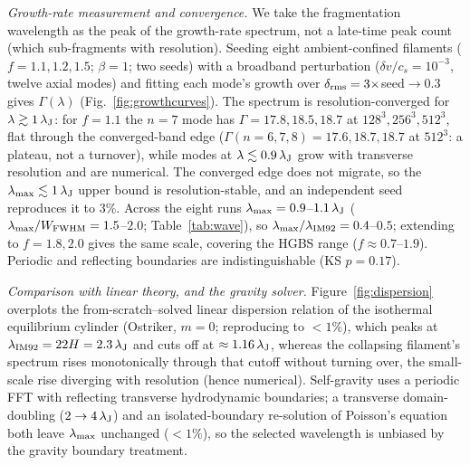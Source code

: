 \documentclass[usenatbib,twoside,twocolumn]{mnras}
\begin{document}
\emph{Growth-rate measurement and convergence.} We take the fragmentation wavelength as the peak of the growth-rate spectrum, not a late-time peak count (which sub-fragments with resolution). Seeding eight ambient-confined filaments ($f=1.1,1.2,1.5$; $\beta=1$; two seeds) with a broadband perturbation ($\delta v/c_s=10^{-3}$, twelve axial modes) and fitting each mode's growth over $\delta_{\rm rms}=3\times$seed$\to0.3$ gives $\Gamma(\lambda)$ (Fig.~\ref{fig:growthcurves}). The spectrum is resolution-converged for $\lambda\gtrsim1\,\lambda_{\rm J}$: for $f=1.1$ the $n=7$ mode has $\Gamma=17.8,18.5,18.7$ at $128^3,256^3,512^3$, flat through the converged-band edge ($\Gamma(n{=}6,7,8)=17.6,18.7,18.7$ at $512^3$: a plateau, not a turnover), while modes at $\lambda\lesssim0.9\,\lambda_{\rm J}$ grow with transverse resolution and are numerical. The converged edge does not migrate, so the $\lambda_{\rm max}\lesssim1\,\lambda_{\rm J}$ upper bound is resolution-stable, and an independent seed reproduces it to $3\%$. Across the eight runs $\lambda_{\rm max}=0.9$--$1.1\,\lambda_{\rm J}$ ($\lambda_{\rm max}/W_{\rm FWHM}=1.5$--$2.0$; Table~\ref{tab:wave}), so $\lambda_{\rm max}/\lambda_{\rm IM92}=0.4$--$0.5$; extending to $f=1.8,2.0$ gives the same scale, covering the HGBS range ($f\approx0.7$--$1.9$). Periodic and reflecting boundaries are indistinguishable (KS $p=0.17$).

\emph{Comparison with linear theory, and the gravity solver.} Figure~\ref{fig:dispersion} overplots the from-scratch--solved linear dispersion relation of the isothermal equilibrium cylinder (Ostriker, $m=0$; reproducing \citealt{Nagasawa1987,Inutsuka1992,Fischera2012} to $<1\%$), which peaks at $\lambda_{\rm IM92}=22H=2.3\,\lambda_{\rm J}$ and cuts off at $\approx1.16\,\lambda_{\rm J}$, whereas the collapsing filament's spectrum rises monotonically through that cutoff without turning over, the small-scale rise diverging with resolution (hence numerical). Self-gravity uses a periodic FFT with reflecting transverse hydrodynamic boundaries; a transverse domain-doubling ($2\to4\,\lambda_{\rm J}$) and an isolated-boundary re-solution of Poisson's equation both leave $\lambda_{\rm max}$ unchanged ($<1\%$), so the selected wavelength is unbiased by the gravity boundary treatment.
\end{document}
